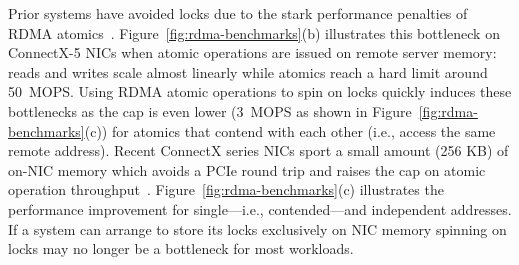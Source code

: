 
Prior systems have avoided locks due to the stark performance
penalties of RDMA atomics~\cite{design-guidelines}.
Figure~\ref{fig:rdma-benchmarks}(b) illustrates this bottleneck on
ConnectX-5 NICs when atomic operations are issued on remote server
memory: reads and writes scale almost linearly while atomics reach a
hard limit around 50~MOPS.  Using RDMA atomic operations to spin on
locks quickly induces these bottlenecks as the cap is even lower
(3~MOPS as shown in Figure~\ref{fig:rdma-benchmarks}(c)) for atomics
that contend with each other (i.e., access the same remote address).
Recent ConnectX series NICs sport a small amount (256 KB) of on-NIC
memory which avoids a PCIe round trip and raises the cap on atomic
operation
throughput~\cite{device-memory,sherman}. Figure~\ref{fig:rdma-benchmarks}(c)
illustrates the performance improvement for
single---i.e., contended---and independent addresses. If a system can arrange to store its locks exclusively on NIC memory spinning on locks may no
longer be a bottleneck for most workloads.



